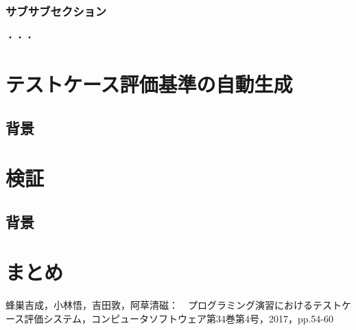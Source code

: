 \documentclass{tpu-sotu}
\begin{document}
\subsection{サブサブセクション}
  ・・・
\chapter{テストケース評価基準の自動生成}
\section{背景}
\chapter{検証}
\section{背景}
\chapter{まとめ}
\acknowledgements
\begin{thebibliography}{1}
    蜂巣吉成，小林悟，吉田敦，阿草清磁：　プログラミング演習におけるテストケース評価システム，コンピュータソフトウェア第34巻第4号，2017，pp.54-60
\end{thebibliography}
\end{document}
